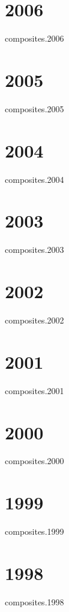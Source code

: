 \documentclass[12pt]{article}
\begin{document}
\section*{2006}
\begin{btSect}{composites.2006}
\btPrintAll
\end{btSect}
%
\section*{2005}
\begin{btSect}{composites.2005}
\btPrintAll
\end{btSect}
%
\section*{2004}
\begin{btSect}{composites.2004}
\btPrintAll
\end{btSect}
%
\section*{2003}
\begin{btSect}{composites.2003}
\btPrintAll
\end{btSect}
%
\section*{2002}
\begin{btSect}{composites.2002}
\btPrintAll
\end{btSect}
%
\section*{2001}
\begin{btSect}{composites.2001}
\btPrintAll
\end{btSect}
%
\section*{2000}
\begin{btSect}{composites.2000}
\btPrintAll
\end{btSect}
%
\section*{1999}
\begin{btSect}{composites.1999}
\btPrintAll
\end{btSect}

\section*{1998}
\begin{btSect}{composites.1998}
\btPrintAll
\end{btSect}
\end{document}
